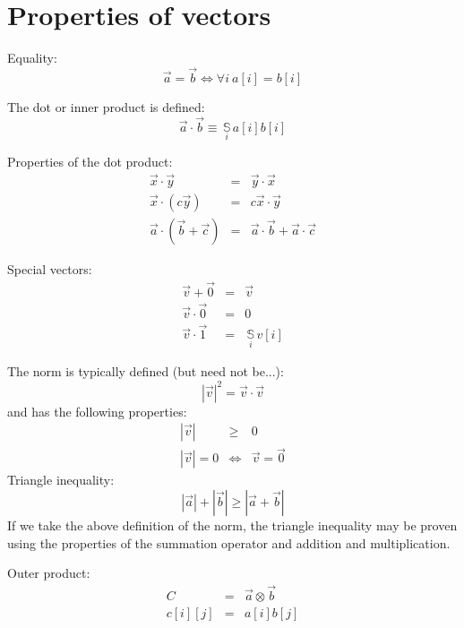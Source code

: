 \documentclass{article}
\newcommand{\inner}{\cdot}
\renewcommand{\outer}{\otimes}
\newcommand{\summation}[1]{\underset{#1}{\,\mathbb{S}\,}}
\begin{document}
\section{Properties of vectors}
\label{vectors}

Equality:
\begin{equation}
	\vec a = \vec b \iff \forall i~a[i] = b[i]
\end{equation}

The dot or inner product is defined:
\begin{equation}
	\vec a \inner \vec b \equiv \summation{i} a[i] b[i]
\end{equation}

Properties of the dot product:
\begin{eqnarray}
	\vec x \inner \vec y & = & \vec y \inner \vec x \\
	\vec x \inner (c \vec y) & = & c \vec x \inner \vec y \\
	\vec a \inner (\vec b + \vec c) & = & \vec a \inner \vec b + \vec a \inner \vec c
\end{eqnarray}

Special vectors:
\begin{eqnarray}
	\vec v + \vec 0 & = & \vec v \\
	\vec v \inner \vec 0 & = & 0 \\
	\vec v \inner \vec 1 & = & \summation{i} v[i]
\end{eqnarray}

The norm is typically defined (but need not be...):
\begin{equation}
	| \vec v |^2 = \vec v \inner \vec v
\end{equation}
and has the following properties:
\begin{eqnarray}
	| \vec v | & \ge & 0 \\
	| \vec v | = 0 & \iff & \vec v = \vec 0
\end{eqnarray}
Triangle inequality:
\begin{equation}
	| \vec a | + | \vec b | \ge | \vec a + \vec b |
\end{equation}
If we take the above definition of the norm, the triangle inequality may
be proven using the properties of the summation operator and addition
and multiplication.

Outer product:
\begin{eqnarray}
	C & = & \vec a \outer \vec b \\
	c[i][j] & = & a[i] b[j]
\end{eqnarray}
\end{document}
